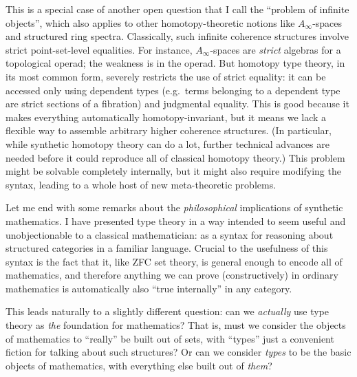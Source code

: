 \documentclass[10pt]{article}
\def\oo{\ensuremath{\infty}}
\def\io{\ensuremath{(\oo,1)}}
\numberwithin{equation}{section}
\begin{document}
This is a special case of another open question that I call the ``problem of infinite objects'', which also applies to other homotopy-theoretic notions like $A_\oo$-spaces and structured ring spectra.
Classically, such infinite coherence structures involve strict point-set-level equalities. %
For instance, $A_\oo$-spaces are \emph{strict} algebras for a topological operad; the weakness is in the operad.
But homotopy type theory, in its most common form, severely restricts the use of strict equality: it can be accessed only using dependent types (e.g.\ terms belonging to a dependent type are strict sections of a fibration) and judgmental equality.
This is good because it makes everything automatically homotopy-invariant, but it means we lack a flexible way to assemble arbitrary higher coherence structures.
(In particular, while synthetic homotopy theory can do a lot, further technical advances are needed before it could reproduce all of classical homotopy theory.)
This problem might be solvable completely internally, but it might also require modifying the syntax, leading to a whole host of new meta-theoretic problems.


Let me end with some remarks about the \emph{philosophical} implications of synthetic mathematics.
I have presented type theory in a way intended to seem useful and unobjectionable to a classical mathematician: as a syntax for reasoning about structured categories in a familiar language.
Crucial to the usefulness of this syntax is the fact that it, like ZFC set theory, is general enough to encode all of mathematics, and therefore anything we can prove (constructively) in ordinary mathematics is automatically also ``true internally'' in any category.

This leads naturally to a slightly different question: can we \emph{actually} use type theory as \emph{the} foundation for mathematics?
That is, must we consider the objects of mathematics to ``really'' be built out of sets, with ``types'' just a convenient fiction for talking about such structures?
Or can we consider \emph{types} to be the basic objects of mathematics, with everything else built out of \emph{them}?
\end{document}

